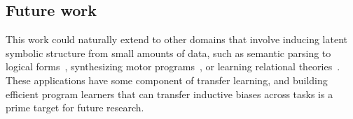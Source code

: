 \documentclass{article}
\begin{document}
\subsection{Future work}
This work could naturally extend to other domains that involve inducing latent symbolic structure from small amounts of data,
such as semantic parsing to logical forms~\cite{liang11dcs},
synthesizing motor programs~\cite{lake2015human},
or learning relational theories~\cite{logical}.
These applications have some component of transfer learning,
and building efficient program learners that can transfer inductive biases across tasks is a prime target for future research.
\pagebreak

{\small }
\end{document}
